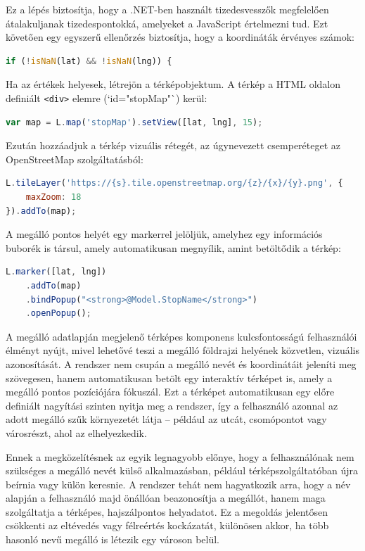 Ez a lépés biztosítja, hogy a .NET-ben használt tizedesvesszők megfelelően átalakuljanak tizedespontokká, amelyeket a JavaScript értelmezni tud. Ezt követően egy egyszerű ellenőrzés biztosítja, hogy a koordináták érvényes számok:

\begin{lstlisting}[language=JavaScript]
if (!isNaN(lat) && !isNaN(lng)) {
\end{lstlisting}

Ha az értékek helyesek, létrejön a térképobjektum. A térkép a HTML oldalon definiált \texttt{<div>} elemre (`id="stopMap"`) kerül:

\begin{lstlisting}[language=JavaScript]
var map = L.map('stopMap').setView([lat, lng], 15);
\end{lstlisting}

Ezután hozzáadjuk a térkép vizuális rétegét, az úgynevezett csemperéteget az OpenStreetMap szolgáltatásból:

\begin{lstlisting}[language=JavaScript]
L.tileLayer('https://{s}.tile.openstreetmap.org/{z}/{x}/{y}.png', {
    maxZoom: 18
}).addTo(map);
\end{lstlisting}

A megálló pontos helyét egy markerrel jelöljük, amelyhez egy információs buborék is társul, amely automatikusan megnyílik, amint betöltődik a térkép:

\begin{lstlisting}[language=JavaScript]
L.marker([lat, lng])
    .addTo(map)
    .bindPopup("<strong>@Model.StopName</strong>")
    .openPopup();
\end{lstlisting}

A megálló adatlapján megjelenő térképes komponens kulcsfontosságú felhasználói élményt nyújt, mivel lehetővé teszi a megálló földrajzi helyének közvetlen, vizuális azonosítását. A rendszer nem csupán a megálló nevét és koordinátáit jeleníti meg szövegesen, hanem automatikusan betölt egy interaktív térképet is, amely a megálló pontos pozíciójára fókuszál. Ezt a térképet automatikusan egy előre definiált nagyítási szinten nyitja meg a rendszer, így a felhasználó azonnal az adott megálló szűk környezetét látja – például az utcát, csomópontot vagy városrészt, ahol az elhelyezkedik.

Ennek a megközelítésnek az egyik legnagyobb előnye, hogy a felhasználónak nem szükséges a megálló nevét külső alkalmazásban, például térképszolgáltatóban újra beírnia vagy külön keresnie. A rendszer tehát nem hagyatkozik arra, hogy a név alapján a felhasználó majd önállóan beazonosítja a megállót, hanem maga szolgáltatja a térképes, hajszálpontos helyadatot. Ez a megoldás jelentősen csökkenti az eltévedés vagy félreértés kockázatát, különösen akkor, ha több hasonló nevű megálló is létezik egy városon belül.

